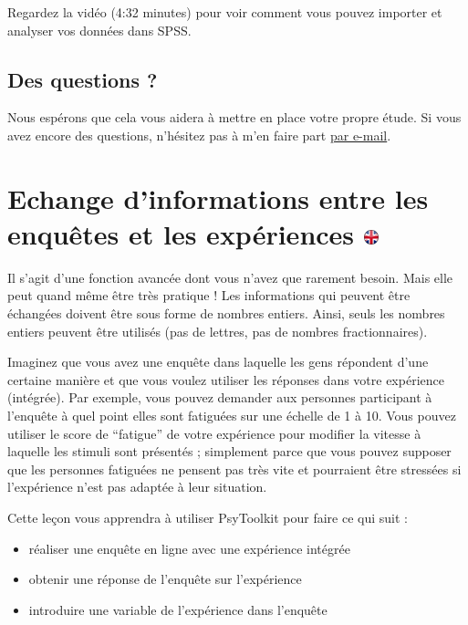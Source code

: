 \documentclass[
]{book}
\providecommand{\tightlist}{%
  \setlength{\itemsep}{0pt}\setlength{\parskip}{0pt}}
\begin{document}
Regardez la vidéo (4:32 minutes) pour voir comment vous pouvez importer
et analyser vos données dans SPSS.

\hypertarget{des-questions}{%
\section{Des questions ?}\label{des-questions}}

Nous espérons que cela vous aidera à mettre en place votre propre étude.
Si vous avez encore des questions, n'hésitez pas à m'en faire part
\href{mailto:psytoolkit@gmx.com}{par e-mail}.

\hypertarget{echange-dinformations-entre-les-enquuxeates-et-les-expuxe9riences}{%
\chapter[Echange d'informations entre les enquêtes et les expériences
]{\texorpdfstring{Echange d'informations entre les enquêtes et les
expériences
\href{https://www.psytoolkit.org/lessons/var_in_out.html}{\protect\includegraphics{img/ukflag.png}}}{Echange d'informations entre les enquêtes et les expériences }}\label{echange-dinformations-entre-les-enquuxeates-et-les-expuxe9riences}}

Il s'agit d'une fonction avancée dont vous n'avez que rarement besoin.
Mais elle peut quand même être très pratique ! Les informations qui
peuvent être échangées doivent être sous forme de nombres entiers.
Ainsi, seuls les nombres entiers peuvent être utilisés (pas de lettres,
pas de nombres fractionnaires).

Imaginez que vous avez une enquête dans laquelle les gens répondent
d'une certaine manière et que vous voulez utiliser les réponses dans
votre expérience (intégrée). Par exemple, vous pouvez demander aux
personnes participant à l'enquête à quel point elles sont fatiguées sur
une échelle de 1 à 10. Vous pouvez utiliser le score de ``fatigue'' de
votre expérience pour modifier la vitesse à laquelle les stimuli sont
présentés ; simplement parce que vous pouvez supposer que les personnes
fatiguées ne pensent pas très vite et pourraient être stressées si
l'expérience n'est pas adaptée à leur situation.

Cette leçon vous apprendra à utiliser PsyToolkit pour faire ce qui suit
:

\begin{itemize}
\tightlist
\item
  réaliser une enquête en ligne avec une expérience intégrée
\item
  obtenir une réponse de l'enquête sur l'expérience
\item
  introduire une variable de l'expérience dans l'enquête
\end{itemize}
\end{document}

